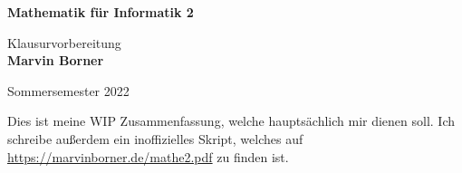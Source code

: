 \begin{titlepage}
	\begin{center}
		\vspace*{1cm}

		{\huge\textbf{Mathematik für Informatik 2}}

		\vspace{0.5cm}
		{\Large Klausurvorbereitung}\\
		\textbf{Marvin Borner}

		\vfill
		Sommersemester 2022
	\end{center}
\end{titlepage}

\pagebreak\hspace{0pt}\vfill\begin{center}{\Large Dies ist meine WIP Zusammenfassung, welche hauptsächlich mir dienen soll. Ich schreibe außerdem ein inoffizielles Skript, welches auf \url{https://marvinborner.de/mathe2.pdf} zu finden ist.}\end{center}\vfill\hspace{0pt}\pagebreak
